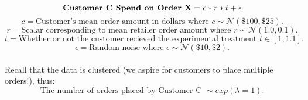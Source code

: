 \documentclass[12pt]{article}
\begin{document}
\[\text{\bf{Customer C Spend on Order X}} = c*r*t + \epsilon \]
\[c = \text{Customer's mean order amount in dollars where } c \sim \mathcal{N}(\$100,\$25).\]
\[r = \text{Scalar corresponding to mean retailer order amount where } r \sim \mathcal{N}(1.0,0.1).\]
\[t = \text{Whether or not the customer recieved the experimental treatment } t \in [1,1.1].\]
\[\epsilon = \text{Random noise where } \epsilon \sim \mathcal{N}(\$10,\$2).\]
\\
\indent\indent Recall that the data is clustered (we aspire for customers to place multiple orders!), thus:
\[\text{The number of orders placed by Customer C }  \sim exp(\lambda = 1).\]
\end{document}
